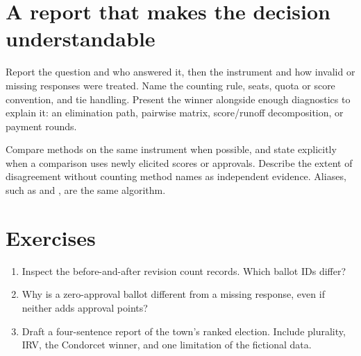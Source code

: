 \clearpage
\section{A report that makes the decision understandable}
Report the question and who answered it, then the instrument and how invalid or missing responses were treated. Name the counting rule, seats, quota or score convention, and tie handling. Present the winner alongside enough diagnostics to explain it: an elimination path, pairwise matrix, score/runoff decomposition, or payment rounds.

Compare methods on the same instrument when possible, and state explicitly when a comparison uses newly elicited scores or approvals. Describe the extent of disagreement without counting method names as independent evidence. Aliases, such as  and , are the same algorithm.

\section{Exercises}
\begin{enumerate}
\item Inspect the before-and-after revision count records. Which ballot IDs differ?
\item Why is a zero-approval ballot different from a missing response, even if neither adds approval points?
\item Draft a four-sentence report of the town's ranked election. Include plurality, IRV, the Condorcet winner, and one limitation of the fictional data.
\end{enumerate}
